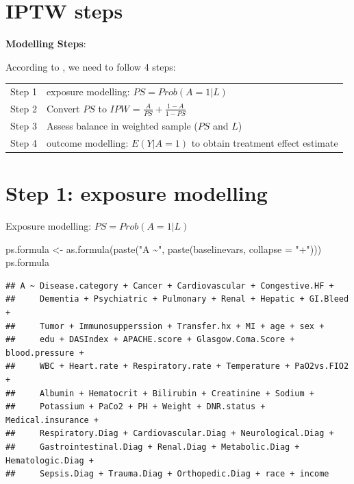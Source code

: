 \documentclass[
]{book}
\newenvironment{Shaded}{\begin{snugshade}}{\end{snugshade}}
\newcommand{\AttributeTok}[1]{\textcolor[rgb]{0.77,0.63,0.00}{#1}}
\newcommand{\FunctionTok}[1]{\textcolor[rgb]{0.00,0.00,0.00}{#1}}
\newcommand{\NormalTok}[1]{#1}
\newcommand{\OtherTok}[1]{\textcolor[rgb]{0.56,0.35,0.01}{#1}}
\newcommand{\StringTok}[1]{\textcolor[rgb]{0.31,0.60,0.02}{#1}}
\begin{document}
\hypertarget{iptw-steps}{%
\section{IPTW steps}\label{iptw-steps}}

\textbf{Modelling Steps}:

According to \citet{austin2011tutorial}, we need to follow 4 steps:

\begin{longtable}[]{@{}ll@{}}
\toprule
\endhead
Step 1 & exposure modelling: \(PS = Prob(A=1|L)\)\tabularnewline
Step 2 & Convert \(PS\) to \(IPW\) = \(\frac{A}{PS} + \frac{1-A}{1-PS}\)\tabularnewline
Step 3 & Assess balance in weighted sample (\(PS\) and \(L\))\tabularnewline
Step 4 & outcome modelling: \(E(Y|A=1)\) to obtain treatment effect estimate\tabularnewline
\bottomrule
\end{longtable}

\hypertarget{step-1-exposure-modelling}{%
\section{Step 1: exposure modelling}\label{step-1-exposure-modelling}}

\begin{rmdcomment}
Exposure modelling: \(PS = Prob(A=1|L)\)
\end{rmdcomment}

\begin{Shaded}
\begin{Highlighting}[]
\NormalTok{ps.formula }\OtherTok{\textless{}{-}} \FunctionTok{as.formula}\NormalTok{(}\FunctionTok{paste}\NormalTok{(}\StringTok{"A \textasciitilde{}"}\NormalTok{,}
                               \FunctionTok{paste}\NormalTok{(baselinevars,}
                                     \AttributeTok{collapse =} \StringTok{"+"}\NormalTok{)))}
\NormalTok{ps.formula}
\end{Highlighting}
\end{Shaded}

\begin{verbatim}
## A ~ Disease.category + Cancer + Cardiovascular + Congestive.HF + 
##     Dementia + Psychiatric + Pulmonary + Renal + Hepatic + GI.Bleed + 
##     Tumor + Immunosupperssion + Transfer.hx + MI + age + sex + 
##     edu + DASIndex + APACHE.score + Glasgow.Coma.Score + blood.pressure + 
##     WBC + Heart.rate + Respiratory.rate + Temperature + PaO2vs.FIO2 + 
##     Albumin + Hematocrit + Bilirubin + Creatinine + Sodium + 
##     Potassium + PaCo2 + PH + Weight + DNR.status + Medical.insurance + 
##     Respiratory.Diag + Cardiovascular.Diag + Neurological.Diag + 
##     Gastrointestinal.Diag + Renal.Diag + Metabolic.Diag + Hematologic.Diag + 
##     Sepsis.Diag + Trauma.Diag + Orthopedic.Diag + race + income
\end{verbatim}
\end{document}
